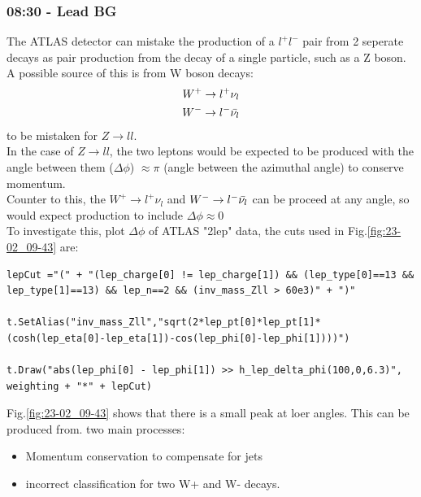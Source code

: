 \subsubsection*{08:30 - Lead BG}
The ATLAS detector can mistake the production of a $l^+ l^-$ pair from 2 seperate decays as pair production from the decay of a single particle, such as a Z boson. 
\\
A possible source of this is from W boson decays:
\begin{align*}
    W^+ \rightarrow l^+ \nu_{l}
    \\
    W^- \rightarrow l^- \Bar{\nu_{l}}
\end{align*}
to be mistaken for $Z \rightarrow ll$.
\\
In the case of $Z \rightarrow ll$, the two leptons would be expected to be produced with the angle between them ($\Delta \phi$) $\approx \pi$ (angle between the azimuthal angle) to conserve momentum.
\\
Counter to this, the  $W^+ \rightarrow l^+ \nu_{l}$ and $W^- \rightarrow l^- \Bar{\nu_{l}}$ can be proceed at any angle, so would expect production to include $\Delta \phi \approx 0$
\\
To investigate this, plot $\Delta \phi$ of ATLAS "2lep" data, the cuts used in Fig.\ref{fig:23-02_09-43} are:
\begin{lstlisting}
lepCut ="(" + "(lep_charge[0] != lep_charge[1]) && (lep_type[0]==13 && lep_type[1]==13) && lep_n==2 && (inv_mass_Zll > 60e3)" + ")"
    
t.SetAlias("inv_mass_Zll","sqrt(2*lep_pt[0]*lep_pt[1]*(cosh(lep_eta[0]-lep_eta[1])-cos(lep_phi[0]-lep_phi[1])))")

t.Draw("abs(lep_phi[0] - lep_phi[1]) >> h_lep_delta_phi(100,0,6.3)", weighting + "*" + lepCut)
\end{lstlisting}

Fig.\ref{fig:23-02_09-43} shows that there is a small peak at loer angles.  This can be produced from. two main processes:
\begin{itemize}
    \item Momentum conservation to compensate for jets
    \item incorrect classification for two W+ and W- decays.
\end{itemize}


